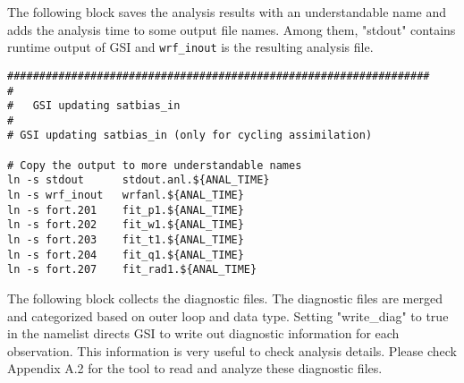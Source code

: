 The following block saves the analysis results with an understandable name and adds the analysis time to some output file names. Among them, "stdout" contains runtime output of GSI and \verb|wrf_inout| is the resulting analysis file.

\begin{footnotesize}
\begin{verbatim}
##################################################################
#
#   GSI updating satbias_in
#
# GSI updating satbias_in (only for cycling assimilation)

# Copy the output to more understandable names
ln -s stdout      stdout.anl.${ANAL_TIME}
ln -s wrf_inout   wrfanl.${ANAL_TIME}
ln -s fort.201    fit_p1.${ANAL_TIME}
ln -s fort.202    fit_w1.${ANAL_TIME}
ln -s fort.203    fit_t1.${ANAL_TIME}
ln -s fort.204    fit_q1.${ANAL_TIME}
ln -s fort.207    fit_rad1.${ANAL_TIME}
\end{verbatim}
\end{footnotesize}

The following block collects the diagnostic files. The diagnostic files are merged and categorized based on outer loop and data type. Setting "write\_diag" to true in the namelist directs GSI to write out diagnostic information for each observation. This information is very useful to check analysis details. Please check Appendix A.2 for the tool to read and analyze these diagnostic files.

